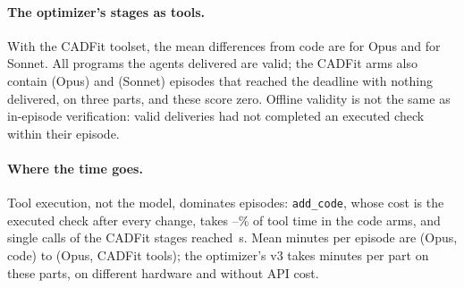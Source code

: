 \paragraph{The optimizer's stages as tools.} With the CADFit toolset, the mean differences from code are \cOpusSkillsVsCode{} \cOpusSkillsVsCodeCI{} for Opus and \cSonnetSkillsVsCode{} \cSonnetSkillsVsCodeCI{} for Sonnet. All \cDeliveredValid{} programs the agents delivered are valid; the CADFit arms also contain \cOpusSkillsNoOut{} (Opus) and \cSonnetSkillsNoOut{} (Sonnet) episodes that reached the deadline with nothing delivered, on three parts, and these score zero. Offline validity is not the same as in-episode verification: \cValidUnverified{} valid deliveries had not completed an executed check within their episode.

\paragraph{Where the time goes.} Tool execution, not the model, dominates episodes: \texttt{add\_code}, whose cost is the executed check after every change, takes \cAddCodeShareLo--\cAddCodeShareHi\% of tool time in the code arms, and single calls of the CADFit stages reached \cMaxCall\,s. Mean minutes per episode are \cOpusCodeMin{} (Opus, code) to \cOpusSkillsMin{} (Opus, CADFit tools); the optimizer's v3 takes \hMinFortyVThree{} minutes per part on these parts, on different hardware and without API cost.
